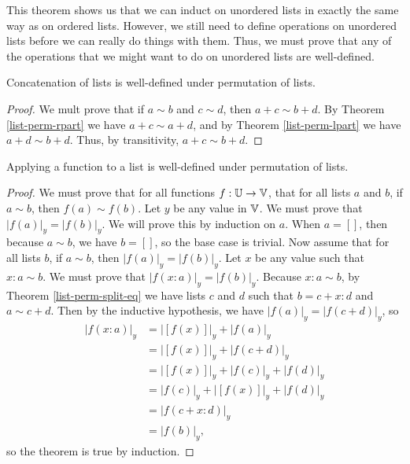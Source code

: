 \documentclass[../math.tex]{subfiles}
\begin{document}
This theorem shows us that we can induct on unordered lists in exactly the same
way as on ordered lists.  However, we still need to define operations on
unordered lists before we can really do things with them.  Thus, we must prove
that any of the operations that we might want to do on unordered lists are
well-defined.

\begin{lemma}
    Concatenation of lists is well-defined under permutation of lists.
\end{lemma}
\begin{proof}
    We mult prove that if $a \sim b$ and $c \sim d$, then $a + c \sim b + d$.
    By Theorem \ref{list-perm-rpart} we have $a + c \sim a + d$, and by Theorem
    \ref{list-perm-lpart} we have $a + d \sim b + d$.  Thus, by transitivity, $a
    + c \sim b + d$.
\end{proof}

\begin{lemma}
    Applying a function to a list is well-defined under permutation of lists.
\end{lemma}
\begin{proof}
    We must prove that for all functions $f : \mathbb{U} \to \mathbb{V}$, that for all lists $a$
    and $b$, if $a \sim b$, then $f(a) \sim f(b)$.  Let $y$ be any value in
    $\mathbb{V}$.  We must prove that $|f(a)|_y = |f(b)|_y$.  We will prove this by
    induction on $a$.  When $a = []$, then because $a \sim b$, we have $b = []$,
    so the base case is trivial.  Now assume that for all lists $b$, if $a \sim
    b$, then $|f(a)|_y = |f(b)|_y$.  Let $x$ be any value such that $x : a \sim
    b$.  We must prove that $|f(x : a)|_y = |f(b)|_y$.  Because $x : a \sim b$,
    by Theorem \ref{list-perm-split-eq} we have lists $c$ and $d$ such that $b =
    c + x : d$ and $a \sim c + d$.  Then by the inductive hypothesis, we have
    $|f(a)|_y = |f(c + d)|_y$, so
    \begin{align*}
        |f(x : a)|_y
        &= |[f(x)]|_y + |f(a)|_y \\
        &= |[f(x)]|_y + |f(c + d)|_y \\
        &= |[f(x)]|_y + |f(c)|_y + |f(d)|_y \\
        &= |f(c)|_y + |[f(x)]|_y + |f(d)|_y \\
        &= |f(c + x : d)|_y \\
        &= |f(b)|_y,
    \end{align*}
    so the theorem is true by induction.
\end{proof}
\end{document}
